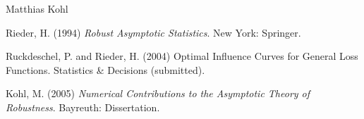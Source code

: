 \begin{Author}\relax
Matthias Kohl 
\end{Author}
\begin{References}\relax
Rieder, H. (1994) \emph{Robust Asymptotic Statistics}. New York: Springer.

Ruckdeschel, P. and Rieder, H. (2004) Optimal Influence Curves for
General Loss Functions. Statistics \& Decisions (submitted).

Kohl, M. (2005) \emph{Numerical Contributions to the Asymptotic Theory of Robustness}. 
Bayreuth: Dissertation.
\end{References}
\begin{SeeAlso}\relax
{}
\end{SeeAlso}

